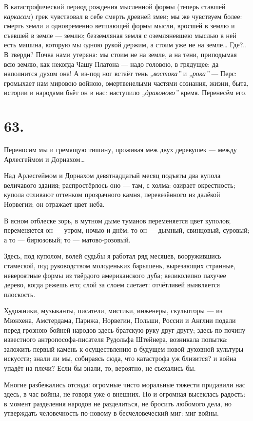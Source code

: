 \documentclass[12pt,a4paper,oneside]{book}
\begin{document}
В катастрофический период рождения мысленной формы (теперь ставшей \emph{каркасом}) грек чувствовал в себе смерть древней змеи; мы же чувствуем более: смерть земли и одновременно ветшающей формы мысли, вросшей в землю и съевшей в земле — землю; безземляная земля с оземляневшею мыслью в ней есть машина, которую мы одною рукой держим, а стоим уже не на земле… Где?.. В тверди? Почва нами утеряна: мы стоим не на земле, а на тени, приподымая всю землю, как некогда Чашу Платона — надо головою, в грядущее: да наполнится духом она! А из-под ног встаёт тень \emph{„востока”} и \emph{„рока”} — Перс: громыхает нам мировою войною, омертвенелыми частями сознания, жизни, быта, истории и народами бьёт он в нас: наступило \emph{„драконово”} время. Перенесём его.

\section*{63.}

Переносим мы и гремящую тишину, проживая меж двух деревушек — между Арлесгеймом и Дорнахом…

Над Арлесгеймом и Дорнахом девятнадцатый месяц подъяты два купола величавого здания; распростёрлось оно — там, с холма: озирает окрестность; купола отливают оттенком прозрачного камня, перевезённого из далёкой Норвегии; он отражает цвет неба.

В ясном отблеске зорь, в мутном дыме туманов переменяется цвет куполов; переменяется он — утром, ночью и днём; то он — дымный, свинцовый, суровый; а то — бирюзовый; то — матово-розовый.

Здесь, под куполом, волей судьбы я работал ряд месяцев, вооружившись стамеской, под руководством молоденьких барышень, вырезающих странные, невероятные формы из твёрдого американского дуба; великолепно пахучее дерево, когда режешь его; слой за слоем слетает: отчётливей выявляется плоскость.

Художники, музыканты, писатели, мистики, инженеры, скульпторы — из Мюнхена, Амстердама, Парижа, Норвегии, Польши, России и Англии подали перед грозною бойней народов здесь братскую руку друг другу; здесь по почину известного антропософа-писателя Рудольфа Штейнера, возникала попытка: заложить первый камень к осуществлению в будущем новой духовной культуры искусств; знали ли мы, собираясь сюда, что катастрофа уж близится? и война упадёт на плечи? Если бы знали, то, вероятно, не съехались бы.

Многие разбежались отсюда: огромные чисто моральные тяжести придавили нас здесь, в час войны, не говоря уже о внешних. Но и огромная высеклась радость: в момент разделения народов не разделиться, не бросить любомого дела, но утверждать человечность по-новому в бесчеловеческий миг: миг войны.
\end{document}
